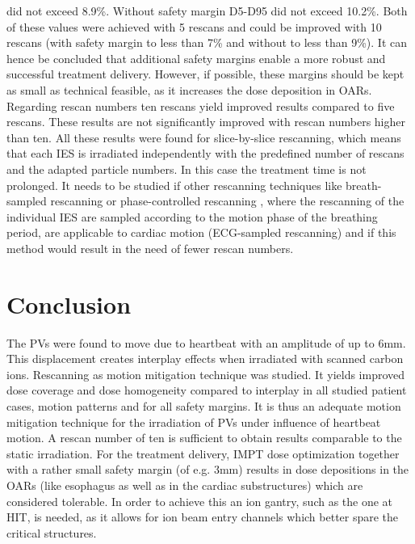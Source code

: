 did not exceed 8.9\%. Without safety margin D5-D95 did not exceed 10.2\%. Both of these values were achieved with 5 rescans and could be 
improved with 10 rescans (with safety margin to less than 7\% and without to less than 9\%). It can hence be concluded that additional 
safety margins enable a more robust and successful treatment delivery. However, if possible, these margins should be kept as small 
as technical feasible, as it increases the dose deposition in OARs. Regarding rescan numbers ten rescans yield improved results compared 
to five rescans. These results are not significantly improved with rescan numbers higher than ten.\newline 
\newline
All these results were found for slice-by-slice rescanning, which means that each IES is irradiated independently with the predefined number 
of rescans and the adapted particle numbers. In this case the treatment time is not prolonged. It needs to be studied if other rescanning 
techniques like breath-sampled rescanning \cite{Sec09} or phase-controlled rescanning \cite{Fur07}, where the rescanning of the individual IES 
are sampled according to the motion phase of the breathing period, are applicable to cardiac motion (ECG-sampled rescanning) and if this 
method would result in the need of fewer rescan numbers. 

\section{Conclusion}

The PVs were found to move due to heartbeat with an amplitude of up to 6mm. 
This displacement creates interplay effects when irradiated with scanned carbon ions. Rescanning as motion mitigation technique was studied. 
It yields improved dose coverage and dose homogeneity compared to interplay in all studied patient cases, motion patterns and 
for all safety margins. It is thus an adequate motion mitigation technique for the irradiation of PVs under influence of heartbeat motion. 
A rescan number of ten is sufficient to obtain results comparable to the static irradiation. 
For the treatment delivery, IMPT dose optimization together with a rather small safety margin (of e.g. 3mm) results in dose depositions in the 
OARs (like esophagus as well as in the cardiac substructures) which are considered tolerable. In order to achieve this an ion gantry, 
such as the one at HIT, is needed, as it allows for ion beam entry channels which better spare the critical structures. 








